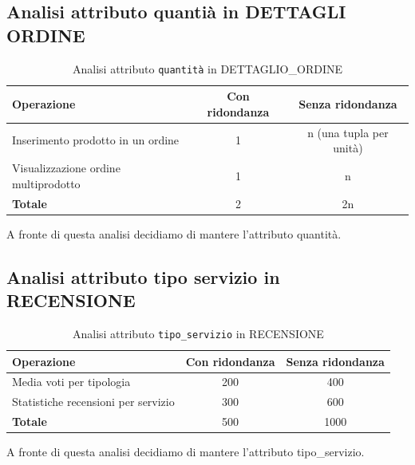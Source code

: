 \documentclass[a4paper,12pt]{report}
\begin{document}
\subsection{Analisi attributo quantià in DETTAGLI ORDINE}

\begin{table}[H]
	\centering
	\begin{tabular}{|l|c|c|}
		\hline
		\textbf{Operazione}                  & \textbf{Con ridondanza} & \textbf{Senza ridondanza} \\
		\hline
		Inserimento prodotto in un ordine    & 1                       & n (una tupla per unità)   \\
		Visualizzazione ordine multiprodotto & 1                       & n                         \\
		\hline
		\textbf{Totale}                      & 2                       & 2n                        \\
		\hline
	\end{tabular}
	\caption{Analisi attributo \texttt{quantità} in DETTAGLIO\_ORDINE}
\end{table}

A fronte di questa analisi decidiamo di mantere l'attributo quantità.

\subsection{Analisi attributo tipo servizio in RECENSIONE}

\begin{table}[H]
	\centering
	\begin{tabular}{|l|c|c|}
		\hline
		\textbf{Operazione}                 & \textbf{Con ridondanza} & \textbf{Senza ridondanza} \\
		\hline
		Media voti per tipologia            & 200                     & 400                       \\
		Statistiche recensioni per servizio & 300                     & 600                       \\
		\hline
		\textbf{Totale}                     & 500                     & 1000                      \\
		\hline
	\end{tabular}
	\caption{Analisi attributo \texttt{tipo\_servizio} in RECENSIONE}
\end{table}

A fronte di questa analisi decidiamo di mantere l'attributo tipo\_servizio.
\end{document}
